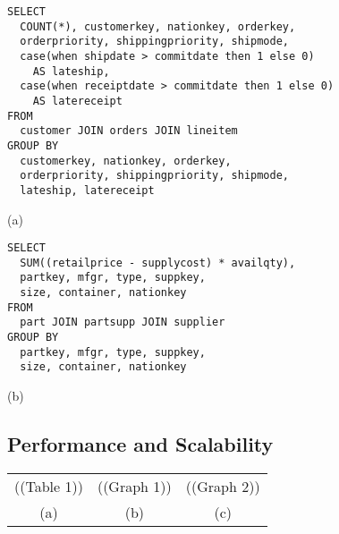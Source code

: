 \begin{figure*}
\begin{center}
\begin{minipage}{3.4in}
\begin{verbatim}
SELECT
  COUNT(*), customerkey, nationkey, orderkey, 
  orderpriority, shippingpriority, shipmode,
  case(when shipdate > commitdate then 1 else 0) 
    AS lateship,
  case(when receiptdate > commitdate then 1 else 0) 
    AS latereceipt
FROM
  customer JOIN orders JOIN lineitem
GROUP BY
  customerkey, nationkey, orderkey, 
  orderpriority, shippingpriority, shipmode,
  lateship, latereceipt
\end{verbatim}
\begin{center}
(a)
\end{center}
\end{minipage}
\begin{minipage}{3.4in}
\begin{verbatim}
SELECT
  SUM((retailprice - supplycost) * availqty), 
  partkey, mfgr, type, suppkey, 
  size, container, nationkey
FROM
  part JOIN partsupp JOIN supplier
GROUP BY
  partkey, mfgr, type, suppkey, 
  size, container, nationkey
\end{verbatim}
\begin{center}
(b)
\end{center}
\end{minipage}
\end{center}
\caption{Example queries used in evaluating sliceDBread.  (a) A COL query class example that produces a materialized view for analysis of order fulfilment delays, and (b) A PPsS query class example that produces a materialized view for analysis of potential asset acquisition.}
\label{fig:experimentqueries}
\end{figure*}

\subsection{Performance and Scalability}
\label{sec:exp:performance}
\label{sec:exp:scalability}

\begin{figure*}
\begin{center}
\begin{tabular}{ccc}
((Table 1)) & ((Graph 1)) & ((Graph 2)) \\
(a) & (b) & (c)
\end{tabular}
\caption{Baseline performance characteristics of sliceDBread.  (a) Per-node memory usage for a range of data-sizes and query classes.  (b) Average CPU usage at each node for a fixed-size cluster as data update rate increases.  (c) Network bandwidth usage across the network as data update rate increases.}
\label{fig:performance}
\end{center}
\end{figure*}

